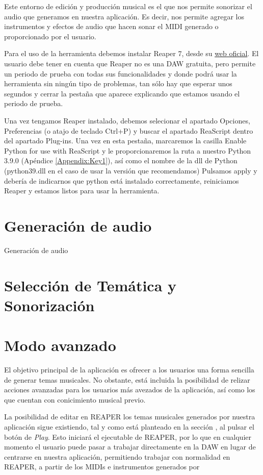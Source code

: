 	Este entorno de edición y producción musical es el que nos permite sonorizar el audio que generamos en nuestra aplicación. Es decir, nos permite agregar los instrumentos y efectos de audio que hacen sonar el MIDI generado o proporcionado por el usuario.
    
    Para el uso de la herramienta debemos instalar Reaper 7, desde su \href{https://www.reaper.fm/download.php}{web oficial}. El usuario debe tener en cuenta que Reaper no es una DAW gratuita, pero permite un periodo de prueba con todas sus funcionalidades y donde podrá usar la herramienta sin ningún tipo de problemas, tan sólo hay que esperar unos segundos y cerrar la pestaña que aparece explicando que estamos usando el periodo de prueba.

    Una vez tengamos Reaper instalado, debemos selecionar el apartado Opciones, Preferencias (o atajo de teclado Ctrl+P) y buscar el apartado ReaScript dentro del apartado Plug-ins. Una vez en esta pestaña, marcaremos la casilla Enable Python for use with ReaScript y le proporcionaremos la ruta a nuestro Python 3.9.0 (Apéndice \ref{Appendix:Key1}), así como el nombre de la dll de Python (python39.dll en el caso de usar la versión que recomendamos) Pulsamos apply y debería de indicarnos que python está instalado correctamente, reiniciamos Reaper y estamos listos para usar la herramienta.

\section{Generación de audio}
\label{sec:generacionAudio}
	Generación de audio
\section{Selección de Temática y Sonorización}
\label{sec:SeleccionTematica}

\section{Modo avanzado}
\label{sec:app:advancedMode}
El objetivo principal de la aplicación es ofrecer a los usuarios una forma sencilla de generar temas musicales. No obstante, está incluida la posibilidad de relizar acciones avanzadas para los usuarios más avezados de la aplicación, así como los que cuentan con conicimiento musical previo.

La posibilidad de editar en REAPER los temas musicales generados por nuestra aplicación sigue existiendo, tal y como está planteado en la sección , al pulsar el botón de \textit{Play}. Esto iniciará el ejecutable de REAPER, por lo que en cualquier momento el usuario puede pasar a trabajar directamente en la DAW en lugar de centrarse en nuestra aplicación, permitiendo trabajar con normalidad en REAPER, a partir de los MIDIs e instrumentos generados por \appName{}

